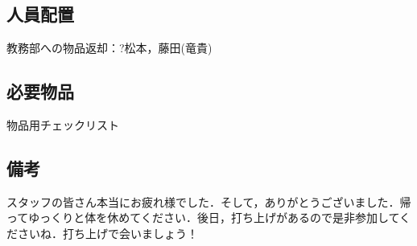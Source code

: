 \subsection{人員配置}
教務部への物品返却：?松本，藤田(竜貴)

\subsection{必要物品}
物品用チェックリスト


\subsection{備考}
スタッフの皆さん本当にお疲れ様でした．そして，ありがとうございました．帰ってゆっくりと体を休めてください．後日，打ち上げがあるので是非参加してくださいね．打ち上げで会いましょう！

%

